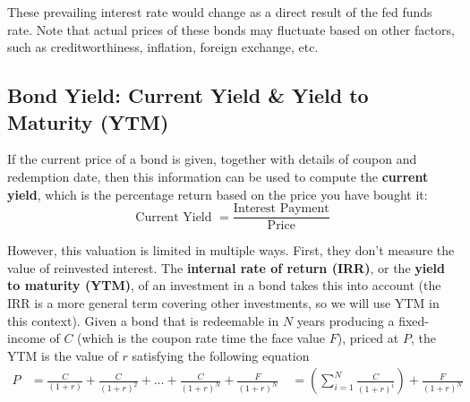 \documentclass{article}
\begin{document}
    These prevailing interest rate would change as a direct result of the fed funds rate. Note that actual prices of these bonds may fluctuate based on other factors, such as creditworthiness, inflation, foreign exchange, etc.

  \subsection{Bond Yield: Current Yield \& Yield to Maturity (YTM)}

    If the current price of a bond is given, together with details of coupon and redemption date, then this information can be used to compute the \textbf{current yield}, which is the percentage return based on the price you have bought it:
    \begin{equation}
      \text{Current Yield } = \frac{\text{Interest Payment}}{\text{Price}}
    \end{equation}

    However, this valuation is limited in multiple ways. First, they don't measure the value of reinvested interest. The \textbf{internal rate of return (IRR)}, or the \textbf{yield to maturity (YTM)}, of an investment in a bond takes this into account (the IRR is a more general term covering other investments, so we will use YTM in this context). Given a bond that is redeemable in $N$ years producing a fixed-income of $C$ (which is the coupon rate time the face value $F$), priced at $P$, the YTM is the value of $r$ satisfying the following equation
    \begin{align*}
      P & = \frac{C}{(1+r)} + \frac{C}{(1+r)^2} + \ldots + \frac{C}{(1+r)^{N}} + \frac{F}{(1+r)^N} \
      & = \left(\sum_{i=1}^N \frac{C}{(1+r)^i} \right) + \frac{F}{(1+r)^N}
    \end{align*}
\end{document}
